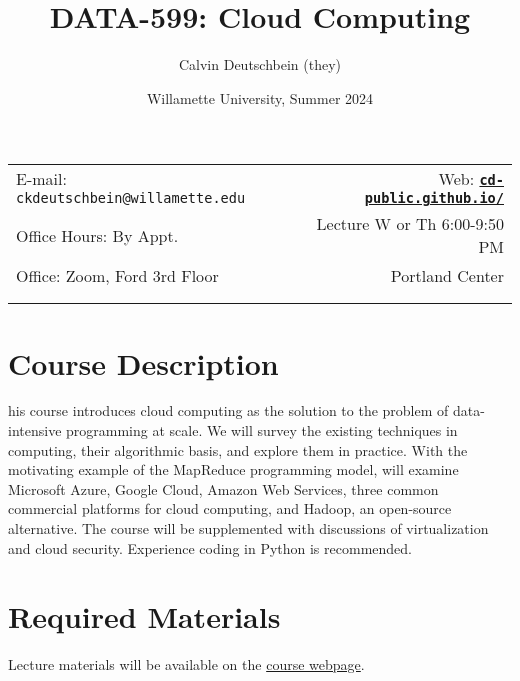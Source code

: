 \documentclass[11pt]{article}
\title{DATA-599: Cloud Computing}
\author{Calvin Deutschbein (they)}
\date{Willamette University, Summer 2024}
\newcommand{\blankline}{\quad\pagebreak[2]}
\begin{document}
\maketitle

\blankline

\begin{tabular*}{.93\textwidth}{@{\extracolsep{\fill}}lr}


E-mail: \texttt{ckdeutschbein@willamette.edu} & Web: \href{https://cd-public.github.io/}{\tt\bf cd-public.github.io/}  \\

 Office Hours: By Appt.  &  Lecture W or Th  6:00-9:50 PM \\

 Office: Zoom, Ford 3rd Floor & Portland Center\\
 & \\
&  \\
\hline
\end{tabular*}

\vspace{5 mm}


\section*{Course Description}

his course introduces cloud computing as the solution to the problem of data-intensive programming at scale. We will survey the existing techniques in computing, their algorithmic basis, and explore them in practice. With the motivating example of the MapReduce programming model, will examine Microsoft Azure, Google Cloud, Amazon Web Services, three common commercial platforms for cloud computing, and Hadoop, an open-source alternative. The course will be supplemented with discussions of virtualization and cloud security. Experience coding in Python is recommended. 


\section*{Required Materials}

Lecture materials will be available on the \href{https://cd-public.github.io/courses/secs24}{course webpage}.
\end{document}
